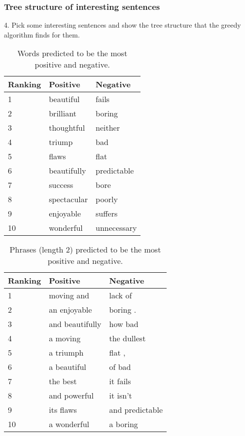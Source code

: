 \documentclass{article}
\newcommand{\ra}[1]{\renewcommand{\arraystretch}{#1}}
\begin{document}
\subsubsection{Tree structure of interesting sentences}
4. Pick some interesting sentences and show the tree structure that the greedy algorithm finds for them.


\begin{table}[t]
    \centering

    \caption{Words predicted to be the most positive and negative.} 
    \label{tab:words}

    \ra{1.2}
    \begin{tabular}{@{} l l l @{}}
        \\
        \toprule
        \bf{Ranking} & \bf{Positive} & \bf{Negative} \\
        \midrule
        1 & beautiful   & fails  \\
        2 & brilliant   & boring \\
        3 & thoughtful  & neither\\
        4 & triump      & bad \\
        5 & flaws       & flat \\
        6 & beautifully & predictable \\
        7 & success     & bore \\
        8 & spectacular & poorly \\
        9 & enjoyable   & suffers \\
        10 & wonderful  & unnecessary \\
        \bottomrule
    \end{tabular}
\end{table}


\begin{table}[t]
    \centering

    \caption{Phrases (length 2) predicted to be the most positive and negative.} 
    \label{tab:phrases}

    \ra{1.2}
    \begin{tabular}{@{} l l l @{}}
        \\
        \toprule
        \bf{Ranking} & \bf{Positive} & \bf{Negative} \\
        \midrule
        1 & moving and      & lack of \\
        2 & an enjoyable    & boring .\\
        3 & and beautifully & how bad \\
        4 & a moving        & the dullest \\
        5 & a triumph       & flat , \\
        6 & a beautiful     & of bad \\
        7 & the best        & it fails \\
        8 & and powerful    & it isn't \\
        9 & its flaws       & and predictable \\
        10 & a wonderful    & a boring \\
        \bottomrule
    \end{tabular}
\end{table}
\end{document}
